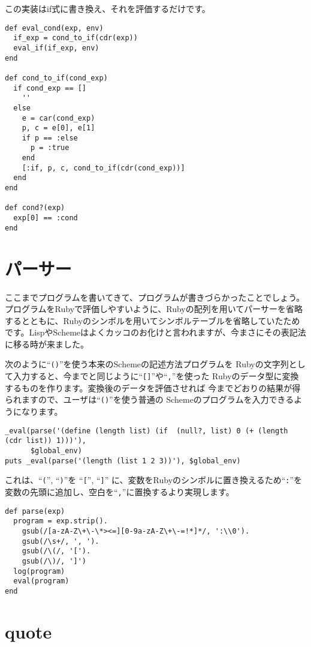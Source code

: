 この実装はif式に書き換え、それを評価するだけです。

\begin{lstlisting}
def eval_cond(exp, env)
  if_exp = cond_to_if(cdr(exp))
  eval_if(if_exp, env)
end

def cond_to_if(cond_exp)
  if cond_exp == []
    ''
  else
    e = car(cond_exp)
    p, c = e[0], e[1]
    if p == :else
      p = :true
    end
    [:if, p, c, cond_to_if(cdr(cond_exp))]
  end  
end

def cond?(exp)
  exp[0] == :cond
end
\end{lstlisting}

\section{パーサー}

ここまでプログラムを書いてきて、プログラムが書きづらかったことでしょう。プログラムをRubyで評価しやすいように、Rubyの配列を用いてパーサーを省略するとともに、Rubyのシンボルを用いてシンボルテーブルを省略していたためです。LispやSchemeはよくカッコのお化けと言われますが、今まさにその表記法に移る時が来ました。

次のように“{\tt ()}”を使う本来のSchemeの記述方法プログラムを
Rubyの文字列として入力すると、今までと同じように“{\tt []}”や“{\tt ,}”を使った
Rubyのデータ型に変換するものを作ります。変換後のデータを評価させれば
今までどおりの結果が得られますので、ユーザは“{\tt ()}”を使う普通の
Schemeのプログラムを入力できるようになります。

\begin{lstlisting}
_eval(parse('(define (length list) (if  (null?, list) 0 (+ (length (cdr list)) 1)))'), 
      $global_env)
puts _eval(parse('(length (list 1 2 3))'), $global_env)
\end{lstlisting}

これは、“{\tt (}”, “{\tt )}”を “{\tt [}”, “{\tt ]}”
に、変数をRubyのシンボルに置き換えるため“{\tt :}”を変数の先頭に追加し、空白を“{\tt ,}”に置換するより実現します。

\label{fun:parse}

\begin{lstlisting}
def parse(exp)
  program = exp.strip().
    gsub(/[a-zA-Z\+\-\*><=][0-9a-zA-Z\+\-=!*]*/, ':\\0').
    gsub(/\s+/, ', ').
    gsub(/\(/, '[').
    gsub(/\)/, ']')
  log(program)
  eval(program)
end
\end{lstlisting}

\section{quote} \label{sec:quote}

